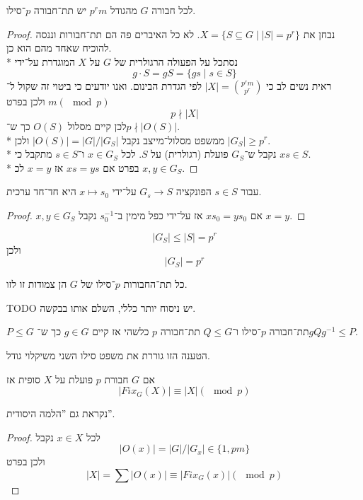 \begin{theorem}
	לכל חבורה $G$ מהגודל $p^r m$ יש תת־חבורה $p$־סילו.
\end{theorem}
\begin{proof}
	נבחן את $X = \{ S \subseteq G \mid |S| = p^r \}$. לא כל האיברים פה הם תת־חבורות וננסה להוכיח שאחד מהם הוא כן. \\*
	נסתכל על הפעולה הרגולרית של $G$ על $X$ המוגדרת על־ידי
	\[
		g \cdot S = gS = \{ gs \mid s \in S \}
	\]
	ראית נשים לב כי  $|X| = \binom{p^r m}{p^r}$ לפי הגדרת הבינום.
	ואנו יודעים כי ביטוי זה שקול ל־$m (\mod p)$ ולכן בפרט
	\[
		p \nmid |X|
	\]
	לכן קיים מסלול $O(S)$ כך ש־$p \nmid |O(S)|$. \\*
	ממשפט מסלול־מייצב נקבל $|O(S)| = |G| / |G_S|$ ולכן $|G_S| \ge p^r$. \\*
	נקבל ש־$G_S$ פועלת (רגולרית) על $S$.
	לכל $x \in G_S$ ו־$s \in S$ מתקבל כי $xs \in S$. \\*
	בפרט אם $xs = ys$ אז $x = y$ לכ $x, y \in G_S$.
\end{proof}
\begin{lemma}
	עבור $s \in S$ הפונקציה $G_s \to S$ על־ידי $x \mapsto s_0$ היא חד־חד ערכית.
\end{lemma}
\begin{proof}
	$x, y \in G_S$ אם $xs_0 = ys_0$ אז על־ידי כפל מימין ב־$s_0^{-1}$ נקבל $x = y$.
\end{proof}
\begin{conclusion}
	\[
		|G_S| \le |S| = p^r
	\]
	ולכן
	\[
		|G_S| = p^r
	\]
\end{conclusion}
\begin{theorem}
	כל תת־החבורות $p$־סילו של $G$ הן צמודות זו לזו.
\end{theorem}
TODO יש ניסוח יותר כללי, השלם אותו בבקשה.
\begin{proposition}
	$P \le G$ תת־חבורה $p$־סילו ו־$Q \le G$ תת־חבורה $p$ כלשהי אז קיים $g \in G$ כך ש־$g Q g^{-1} \le P$.
\end{proposition}
הטענה הזו גוררת את משפט סילו השני משיקלוי גודל.
\begin{lemma}
	אם $G$ חבורת $p$ פועלת על $X$ סופית אז
	\[
		|Fix_G(X)| \equiv |X| (\mod p)
	\]
\end{lemma}
נקראת גם ''הלמה היסודית''.
\begin{proof}
	לכל $x \in X$ נקבל
	\[
		|O(x)| = |G| / |G_x| \in \{ 1, pm \}
	\]
	ולכן בפרט
	\[
		|X| = \sum |O(x)| \equiv |Fix_G(x)| (\mod p)
	\]
\end{proof}

